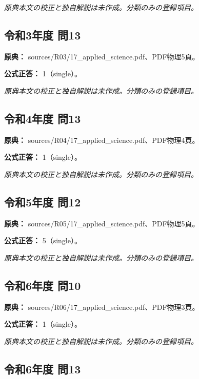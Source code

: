\par\textit{原典本文の校正と独自解説は未作成。分類のみの登録項目。}

\subsection{令和3年度 問13}
\label{q:r03-reg-applied-13}

\noindent\textbf{原典：} sources/R03/17\_applied\_science.pdf、PDF物理5頁。

\textbf{公式正答：} 1（single）。

\par\textit{原典本文の校正と独自解説は未作成。分類のみの登録項目。}

\subsection{令和4年度 問13}
\label{q:r04-reg-applied-13}

\noindent\textbf{原典：} sources/R04/17\_applied\_science.pdf、PDF物理4頁。

\textbf{公式正答：} 1（single）。

\par\textit{原典本文の校正と独自解説は未作成。分類のみの登録項目。}

\subsection{令和5年度 問12}
\label{q:r05-reg-applied-12}

\noindent\textbf{原典：} sources/R05/17\_applied\_science.pdf、PDF物理5頁。

\textbf{公式正答：} 5（single）。

\par\textit{原典本文の校正と独自解説は未作成。分類のみの登録項目。}

\subsection{令和6年度 問10}
\label{q:r06-reg-applied-10}

\noindent\textbf{原典：} sources/R06/17\_applied\_science.pdf、PDF物理3頁。

\textbf{公式正答：} 1（single）。

\par\textit{原典本文の校正と独自解説は未作成。分類のみの登録項目。}

\subsection{令和6年度 問13}
\label{q:r06-reg-applied-13}

